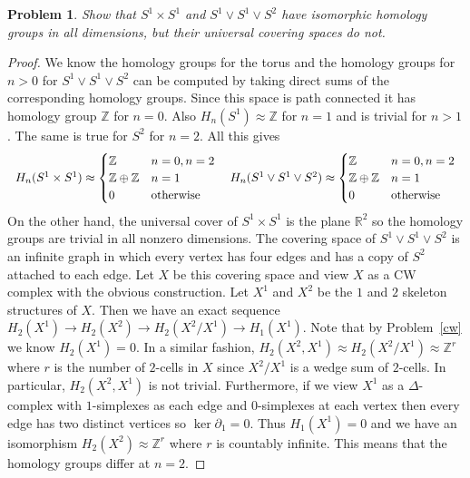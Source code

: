 \documentclass{article}
\newtheorem{problem}{Problem}
\begin{document}
\begin{problem}
\label{covering}
Show that $S^1 \times S^1$ and $S^1 \vee S^1 \vee S^2$ have isomorphic homology groups in all dimensions, but their universal covering spaces do not.
\end{problem}
\begin{proof}
We know the homology groups for the torus and the homology groups for $n > 0$ for $S^1 \vee S^1 \vee S^2$ can be computed by taking direct sums of the corresponding homology groups. Since this space is path connected it has homology group $\mathbb{Z}$ for $n = 0$. Also $H_n(S^1) \approx \mathbb{Z}$ for $n = 1$ and is trivial for $n > 1$. The same is true for $S^2$ for $n = 2$. All this gives
\[
\begin{tabular}{cc}
$H_n(S^1 \times S^1) \approx \begin{cases} \mathbb{Z} & n = 0, n = 2\\ \mathbb{Z} \oplus \mathbb{Z} & n = 1\\ 0 & \textup{otherwise} \end{cases}$
&
$H_n(S^1 \vee S^1 \vee S^2) \approx \begin{cases} \mathbb{Z} & n = 0, n = 2\\ \mathbb{Z} \oplus \mathbb{Z} & n = 1\\ 0 & \textup{otherwise} \end{cases}$
\end{tabular}
\]
On the other hand, the universal cover of $S^1 \times S^1$ is the plane $\mathbb{R}^2$ so the homology groups are trivial in all nonzero dimensions. The covering space of $S^1 \vee S^1 \vee S^2$ is an infinite graph in which every vertex has four edges and has a copy of $S^2$ attached to each edge. Let $X$ be this covering space and view $X$ as a CW complex with the obvious construction. Let $X^1$ and $X^2$ be the $1$ and $2$ skeleton structures of $X$. Then we have an exact sequence $H_2(X^1) \to H_2(X^2) \to H_2(X^2/X^1) \to H_1(X^1)$. Note that by Problem~\ref{cw} we know $H_2(X^1) = 0$. In a similar fashion, $H_2(X^2,X^1) \approx H_2(X^2/X^1) \approx \mathbb{Z}^r$ where $r$ is the number of $2$-cells in $X$ since $X^2/X^1$ is a wedge sum of $2$-cells. In particular, $H_2(X^2, X^1)$ is not trivial. Furthermore, if we view $X^1$ as a $\Delta$-complex with $1$-simplexes as each edge and $0$-simplexes at each vertex then every edge has two distinct vertices so $\ker \partial_1 = 0$. Thus $H_1(X^1) = 0$ and we have an isomorphism $H_2(X^2) \approx \mathbb{Z}^r$ where $r$ is countably infinite. This means that the homology groups differ at $n = 2$.
\end{proof}
\end{document}
